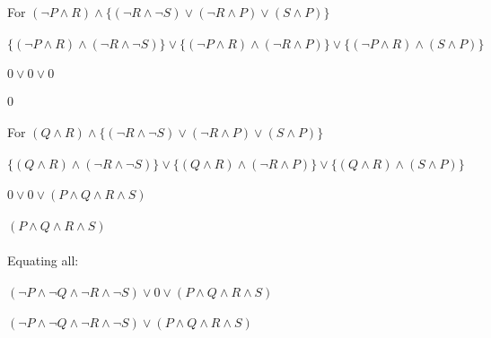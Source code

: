 \documentclass{article}
\begin{document}
    \\
    For $(\neg P \land R) \land \{(\neg R \land \neg S) \lor (\neg R \land P) \lor (S \land P)\}$\\
    \\
    $\{(\neg P \land R) \land (\neg R \land \neg S)\} \lor \{(\neg P \land R) \land (\neg R \land P)\} \lor \{(\neg P \land R) \land (S \land P)\}$\\
    \\
    $0 \lor 0 \lor 0$\\
    \\
    $0$\\
    \\
    For $(Q \land R) \land \{(\neg R \land \neg S) \lor (\neg R \land P) \lor (S \land P)\}$\\
    \\
    $\{(Q \land R) \land (\neg R \land \neg S)\} \lor \{(Q \land R) \land (\neg R \land P)\} \lor \{(Q \land R) \land (S \land P)\}$\\
    \\
    $ 0 \lor 0 \lor (P \land Q \land R \land S)$\\
    \\
    $(P \land Q \land R \land S)$\\
    \\
    Equating all:\\
    \\
    $(\neg P \land \neg Q \land \neg R \land \neg S) \lor 0 \lor (P \land Q \land R \land S)$\\
    \\
    $(\neg P \land \neg Q \land \neg R \land \neg S) \lor (P \land Q \land R \land S)$\\
\end{document}
